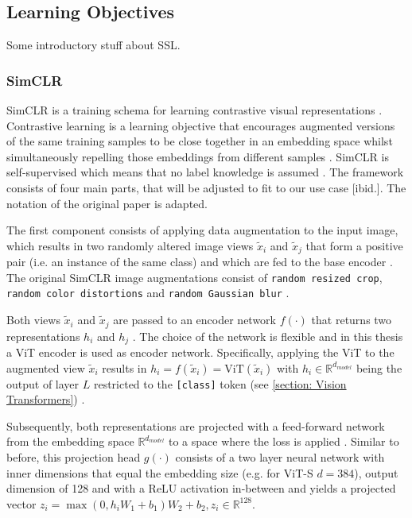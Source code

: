 \subsection{Learning Objectives}
Some introductory stuff about SSL.
\subsubsection{SimCLR}
\label{section: SimCLR}
SimCLR is a training schema for learning contrastive visual representations \citep{Chen2020}.
Contrastive learning is a learning objective that encourages augmented versions of the same training samples to be close together in an embedding space whilst simultaneously repelling those embeddings from different samples \citep{Jaiswal2020}.
SimCLR is self-supervised which means that no label knowledge is assumed \citep{Chen2020}.
The framework consists of four main parts, that will be adjusted to fit to our use case [ibid.].
The notation of the original paper is adapted.
\par
The first component consists of applying data augmentation to the input image, which results in two randomly altered image views $\tilde{x}_i$ and $\tilde{x}_j$ that form a positive pair (i.e. an instance of the same class) and which are fed to the base encoder \citep{Chen2020}.
The original SimCLR image augmentations consist of \texttt{random resized crop}, \texttt{random color distortions} and \texttt{random Gaussian blur} \citep{Chen2020}.
\par
Both views $\tilde{x}_i$ and $\tilde{x}_j$ are passed to an encoder network $f(\cdot)$ that returns two representations $h_i$ and $h_j$ \citep{Chen2020}.
The choice of the network is flexible and in this thesis a ViT encoder is used as encoder network.
Specifically, applying the ViT to the augmented view $\tilde{x}_i$ results in $h_i = f(\tilde{x}_i) = \text{ViT}(\tilde{x}_i)$ with $h_i \in \mathbb{R}^{d_{model}}$ being the output of layer $L$ restricted to the \texttt{[class]} token (see \ref{section: Vision Transformers}) \citep{Chen2020}.
\par
Subsequently, both representations are projected with a feed-forward network from the embedding space $\mathbb{R}^{d_{model}}$ to a space where the loss is applied \citep{Chen2020}.
Similar to before, this projection head $g(\cdot)$ consists of a two layer neural network with inner dimensions that equal the embedding size (e.g. for ViT-S $d=384$), output dimension of 128 and with a ReLU activation in-between \citep{Chen2020} and yields a projected vector $z_i = \max(0, h_iW_1 + b_1)W_2+b_2, z_i \in \mathbb{R}^{128}$.
